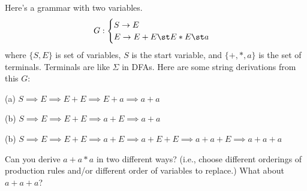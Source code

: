 Here's a grammar with two variables.
\[
G:
\begin{cases}
S \rightarrow E \\
E \rightarrow E + E \st E * E \st a
\end{cases}
\]
where $\{S, E\}$ is set of variables, $S$ is the start variable, and 
$\{+, *, a\}$ is the set of terminals.
Terminals are like $\Sigma$ in DFAs.
Here are some string derivations from this $G$:
\begin{mylist}
\item[(a)] $S \implies E \implies E + E \implies E + a \implies a + a$
\item[(b)] $S \implies E \implies E + E \implies a + E \implies a + a$
\item[(b)] $S \implies E \implies E + E \implies a + E \implies a + E + E
\implies a + a + E \implies a + a + a$
\end{mylist}
Can you derive $a + a * a$ in two different ways?
(i.e., choose different orderings of production rules and/or different
order of variables to replace.)
What about $a + a + a$?
